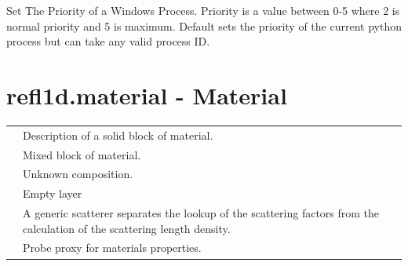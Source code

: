 \documentclass[letterpaper,10pt,english]{sphinxmanual}
\begin{document}

\begin{fulllineitems}
\label{api/mapper:refl1d.mapper.nice}
\end{fulllineitems}


\begin{fulllineitems}
\label{api/mapper:refl1d.mapper.setpriority}
Set The Priority of a Windows Process.  Priority is a value between 0-5
where 2 is normal priority and 5 is maximum.  Default sets the priority
of the current python process but can take any valid process ID.

\end{fulllineitems}



\section{refl1d.material - Material}
\label{api/material::doc}\label{api/material:refl1d-material-material}
\begin{tabulary}{\linewidth}{LL}
\hline

{\hyperref[api/material:refl1d.material.Material]{}}
 & 
Description of a solid block of material.
\\

{\hyperref[api/material:refl1d.material.Mixture]{}}
 & 
Mixed block of material.
\\

{\hyperref[api/material:refl1d.material.SLD]{}}
 & 
Unknown composition.
\\

{\hyperref[api/material:refl1d.material.Vacuum]{}}
 & 
Empty layer
\\

{\hyperref[api/material:refl1d.material.Scatterer]{}}
 & 
A generic scatterer separates the lookup of the scattering factors from the calculation of the scattering length density.
\\

{\hyperref[api/material:refl1d.material.ProbeCache]{}}
 & 
Probe proxy for materials properties.
\\
\hline
\end{tabulary}
\end{document}
